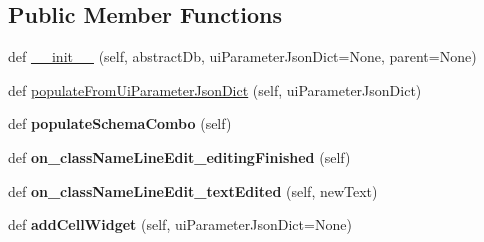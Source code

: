\subsection*{Public Member Functions}
\begin{DoxyCompactItemize}
\item 
def \mbox{\hyperlink{class_dsg_tools_1_1_custom_widgets_1_1_custom_db_management_widgets_1_1new_class_widget_1_1_new_class_widget_a6eb0a12adc995be33bfc52fe5b6d5cae}{\+\_\+\+\_\+init\+\_\+\+\_\+}} (self, abstract\+Db, ui\+Parameter\+Json\+Dict=None, parent=None)
\item 
def \mbox{\hyperlink{class_dsg_tools_1_1_custom_widgets_1_1_custom_db_management_widgets_1_1new_class_widget_1_1_new_class_widget_aaec55aa688c84ae74a41be0a7276ef65}{populate\+From\+Ui\+Parameter\+Json\+Dict}} (self, ui\+Parameter\+Json\+Dict)
\item 
\mbox{\label{class_dsg_tools_1_1_custom_widgets_1_1_custom_db_management_widgets_1_1new_class_widget_1_1_new_class_widget_ae08de344711fd5af55811d1464104bf5}} 
def {\bfseries populate\+Schema\+Combo} (self)
\item 
\mbox{\label{class_dsg_tools_1_1_custom_widgets_1_1_custom_db_management_widgets_1_1new_class_widget_1_1_new_class_widget_af4c539857061f606c331b8e4b2fee1c8}} 
def {\bfseries on\+\_\+class\+Name\+Line\+Edit\+\_\+editing\+Finished} (self)
\item 
\mbox{\label{class_dsg_tools_1_1_custom_widgets_1_1_custom_db_management_widgets_1_1new_class_widget_1_1_new_class_widget_a13ea3f2a9e800573e8803610e9439cc2}} 
def {\bfseries on\+\_\+class\+Name\+Line\+Edit\+\_\+text\+Edited} (self, new\+Text)
\item 
\mbox{\label{class_dsg_tools_1_1_custom_widgets_1_1_custom_db_management_widgets_1_1new_class_widget_1_1_new_class_widget_a6041437162ca5cfc5403a494d5f01cae}} 
def {\bfseries add\+Cell\+Widget} (self, ui\+Parameter\+Json\+Dict=None)
\item 

\end{DoxyCompactItemize}
